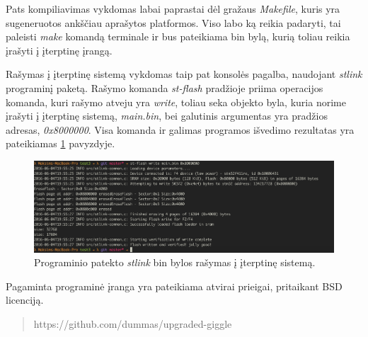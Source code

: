 Pats kompiliavimas vykdomas labai paprastai dėl gražaus \textit{Makefile}, kuris yra sugeneruotos ankščiau aprašytos platformos. Viso labo ką reikia padaryti, tai paleisti \textit{make} komandą terminale ir bus pateikiama bin bylą, kurią toliau reikia įrašyti į įterptinę įrangą. 

Rašymas į įterptinę sistemą vykdomas taip pat konsolės pagalba, naudojant \textit{stlink} programinį paketą. Rašymo komanda \textit{st-flash} pradžioje priima operacijos komanda, kuri rašymo atveju yra \textit{write}, toliau seka objekto byla, kuria norime įrašyti į įterptinę sistemą, \textit{main.bin}, bei galutinis argumentas yra pradžios adresas, \textit{0x8000000}. Visa komanda ir galimas programos išvedimo rezultatas yra pateikiamas \ref{fig:st-link-write} pavyzdyje.

\begin{figure}[H]
    \centering
    \includegraphics[width=500px]{img/st-link-write.png}
    \caption{Programinio patekto \textit{stlink} bin bylos rašymas į įterptinę sistemą.}
    \label{fig:st-link-write}
\end{figure}

Pagaminta programinė įranga yra pateikiama atvirai prieigai, pritaikant BSD licenciją.

\begin{quote}
    https://github.com/dummas/upgraded-giggle
\end{quote}
